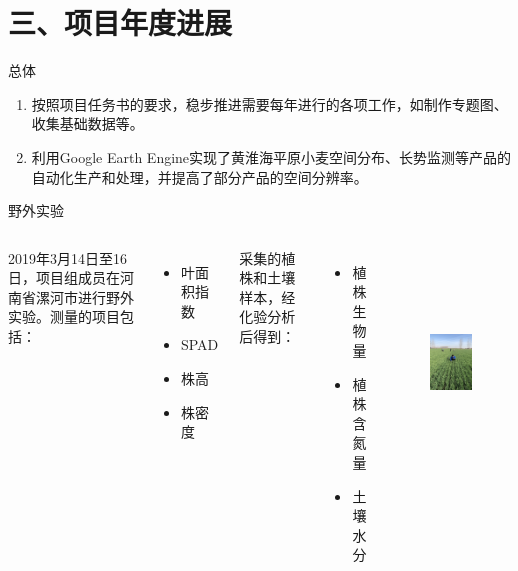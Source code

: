 \documentclass{beamer}
\begin{document}
\section{三、项目年度进展}
\begin{frame}{总体}
\begin{enumerate}
	\item 按照项目任务书的要求，稳步推进需要每年进行的各项工作，如制作专题图、收集基础数据等。
	\item 利用Google Earth Engine实现了黄淮海平原小麦空间分布、长势监测等产品的自动化生产和处理，并提高了部分产品的空间分辨率。
\end{enumerate}
\end{frame}
\begin{frame}{野外实验}
\begin{columns}[c]
\column{6cm}
2019年3月14日至16日，项目组成员在河南省漯河市进行野外实验。测量的项目包括：
\begin{itemize}
	\item 叶面积指数
	\item SPAD
	\item 株高
	\item 株密度
\end{itemize}
采集的植株和土壤样本，经化验分析后得到：
\begin{itemize}
	\item 植株生物量
	\item 植株含氮量
	\item 土壤水分
\end{itemize}
\column{4cm}
\begin{figure}
	\includegraphics[height=6cm]{images/field.jpg}
\end{figure}
\end{columns}
\end{frame}
\end{document}
